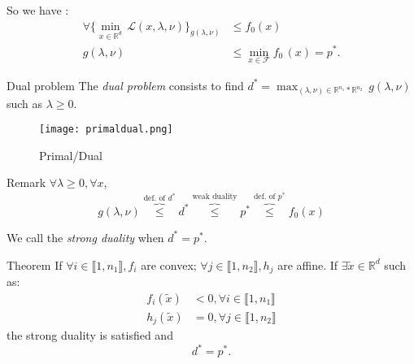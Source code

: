\documentclass[unknownkeysallowed]{beamer}
\begin{document}
 \begin{frame}
\begin{block}{}
So we have :
\begin{align*}
\forall 
\{ \min_{x \in \mathbb{R}^d} \, \mathcal{L}(x,\lambda,\nu )\}_{g(\lambda,\nu)} & \leq f_0(x) \\
g(\lambda,\nu) & \leq \min_{x \in \mathcal{F}} f_0\,(x) = p^{*}.
\end{align*}
\end{block}
\begin{block}{Dual problem}
The \textit{dual problem} consists to find $d^{*} =\displaystyle  \max_{(\lambda,\nu) \in \mathbb{R}^{n_{1}} * \mathbb{R}^{n_{2}}} \, g(\lambda,\nu)$ such as $\lambda \geq 0$.
\end{block}

\end{frame}
\begin{frame}
\begin{figure}[!h]
    \begin{center}
   \caption{\label{étiquette} Primal/Dual}
   \texttt{[image: primaldual.png]}
   \end{center}
    \end{figure}
\end{frame}
\begin{frame}
     \begin{block}{Remark}
        $\forall \lambda \geq 0, \forall x $,
        $$
        g(\lambda, \nu) \overbrace{\leq}^{\text{def. of }d^*} d^* \overbrace{\leq}^{\text{weak duality}} p^* \overbrace{\leq}^{\text{def. of } p^*} f_0(x)
        $$
        
        We call the \textit{strong duality} when $d^*=p^*$.
     \end{block}
     
     \begin{alertblock}{Theorem}
        If $\forall i \in \llbracket 1,n_1 \rrbracket, f_i$ are convex; $\forall j \in \llbracket 1,n_2 \rrbracket, h_j$ are affine. If $\exists \tilde x \in \mathbb{R}^d$ such as: 
        \begin{align*}
            f_i(\tilde x) &< 0, \forall i \in \llbracket 1,n_1 \rrbracket   \\
            h_j(\tilde x) &= 0, \forall j \in \llbracket 1,n_2 \rrbracket 
        \end{align*}
        the strong duality is satisfied and
        $$
        d^* = p^*.
        $$
     \end{alertblock}
\end{frame}
 
\end{document}
